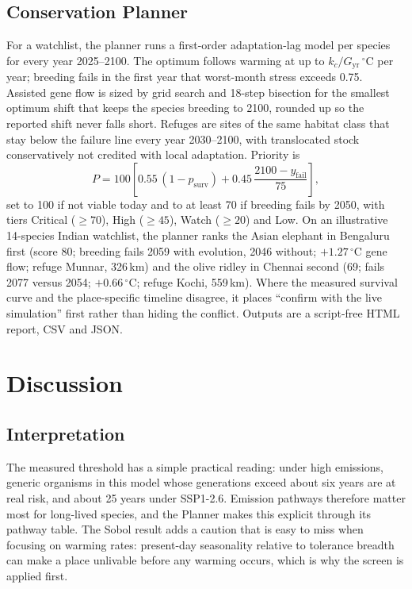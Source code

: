 \documentclass[conference]{IEEEtran}
\begin{document}
\subsection{Conservation Planner}
For a watchlist, the planner runs a first-order adaptation-lag model per species
for every year 2025--2100. The optimum follows warming at up to
$k_c/G_{\text{yr}}$\,$^{\circ}$C per year; breeding fails in the first year that
worst-month stress exceeds 0.75. Assisted gene flow is sized by grid search and
18-step bisection for the smallest optimum shift that keeps the species breeding to
2100, rounded up so the reported shift never falls short. Refuges are sites of the
same habitat class that stay below the failure line every year 2030--2100, with
translocated stock conservatively not credited with local adaptation. Priority is
\begin{equation}
P=100\left[0.55\,(1-p_{\text{surv}})+0.45\,\frac{2100-y_{\text{fail}}}{75}\right],
\end{equation}
set to 100 if not viable today and to at least 70 if breeding fails by 2050, with
tiers Critical ($\ge70$), High ($\ge45$), Watch ($\ge20$) and Low. On an
illustrative 14-species Indian watchlist, the planner ranks the Asian elephant in
Bengaluru first (score 80; breeding fails 2059 with evolution, 2046 without;
$+1.27\,^{\circ}$C gene flow; refuge Munnar, 326\,km) and the olive ridley in
Chennai second (69; fails 2077 versus 2054; $+0.66\,^{\circ}$C; refuge Kochi,
559\,km). Where the measured survival curve and the place-specific timeline
disagree, it places ``confirm with the live simulation'' first rather than hiding
the conflict. Outputs are a script-free HTML report, CSV and JSON.

\section{Discussion}
\subsection{Interpretation}
The measured threshold has a simple practical reading: under high emissions,
generic organisms in this model whose generations exceed about six years are at
real risk, and about 25 years under SSP1-2.6. Emission pathways therefore matter
most for long-lived species, and the Planner makes this explicit through its
pathway table. The Sobol result adds a caution that is easy to miss when focusing on
warming rates: present-day seasonality relative to tolerance breadth can make a
place unlivable before any warming occurs, which is why the screen is applied first.
\end{document}
